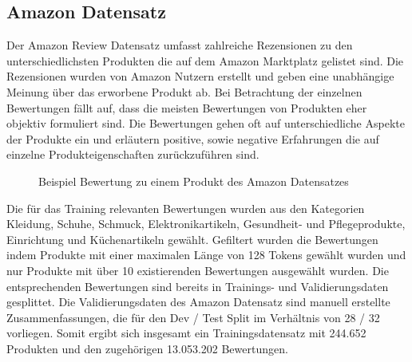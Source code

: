 \subsection{Amazon Datensatz}
Der Amazon Review Datensatz \citep{brazinskas2020-unsupervised} umfasst zahlreiche Rezensionen zu den unterschiedlichsten Produkten die auf dem Amazon Marktplatz gelistet sind.
Die Rezensionen wurden von Amazon Nutzern erstellt und geben eine unabhängige Meinung über das erworbene Produkt ab.
Bei Betrachtung der einzelnen Bewertungen fällt auf, dass die meisten Bewertungen von Produkten eher objektiv formuliert sind. 
Die Bewertungen gehen oft auf unterschiedliche Aspekte der Produkte ein und erläutern positive, sowie negative Erfahrungen die auf einzelne Produkteigenschaften zurückzuführen sind.

\setlength{\fboxsep}{1em}

\begin{figure}[!h]
    \centering
    \scriptsize
    \caption{Beispiel Bewertung zu einem Produkt des Amazon Datensatzes}
\end{figure}

Die für das Training relevanten Bewertungen wurden aus den Kategorien Kleidung, Schuhe, Schmuck, Elektronikartikeln, Gesundheit- und Pflegeprodukte, Einrichtung und Küchenartikeln gewählt.
Gefiltert wurden die Bewertungen indem Produkte mit einer maximalen Länge von 128 Tokens gewählt wurden und nur Produkte mit über 10 existierenden Bewertungen ausgewählt wurden. 
Die entsprechenden Bewertungen sind bereits in Trainings- und Validierungsdaten gesplittet.
Die Validierungsdaten des Amazon Datensatz sind manuell erstellte Zusammenfassungen, die für den Dev / Test Split im Verhältnis von 28 / 32 vorliegen.
Somit ergibt sich insgesamt ein Trainingsdatensatz mit 244.652 Produkten und den zugehörigen 13.053.202 Bewertungen.

